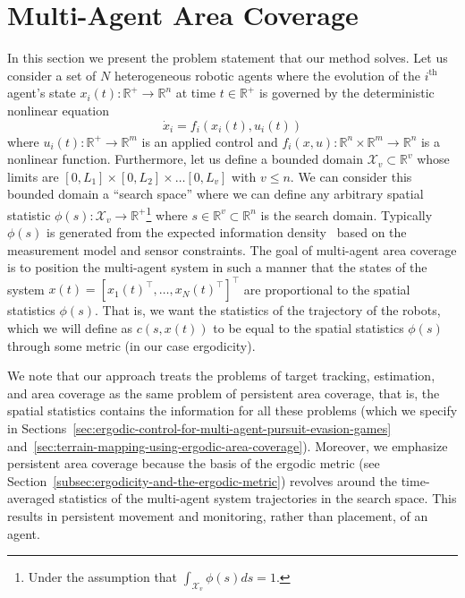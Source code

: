 \documentclass[letterpaper, 10 pt, conference]{ieeeconf}  %
\begin{document}
\section{Multi-Agent Area Coverage}
In this section we present the problem statement that our method solves.
Let us consider a set of $N$ heterogeneous robotic agents where the evolution of the $i^\text{th}$ agent's state $x_i(t) : \mathbb{R}^+ \to \mathbb{R}^n$  at time $t\in \mathbb{R}^+$ is governed by the deterministic nonlinear equation
\begin{equation}
\dot{x}_i = f_i(x_i(t), u_i(t))
\end{equation}
where $u_i(t) : \mathbb{R}^+ \to \mathbb{R}^m$ is an applied control and $f_i(x,u) : \mathbb{R}^n \times \mathbb{R}^m \to \mathbb{R}^n$ is a nonlinear function.
Furthermore, let us define a bounded domain $\mathcal{X}_v \subset \mathbb{R}^v$ whose limits are $\left[ 0, L_1\right]\times \left[ 0, L_2\right] \times \ldots \left[ 0, L_v\right]$ with $v \le n$.
We can consider this bounded domain a ``search space'' where we can define any arbitrary spatial statistic $\phi(s) : \mathcal{X}_v \to \mathbb{R}^+$\footnote{Under the assumption that $\int_{\mathcal{X}_v} \phi(s) ds = 1$.} where $s \in \mathbb{R}^v \subset \mathbb{R}^n$ is the search domain.
Typically $\phi(s)$ is generated from the expected information density~\cite{miller2016ergodic,mavrommatiTRO2017realTime} based on the measurement model and sensor constraints.
The goal of multi-agent area coverage is to position the multi-agent system in such a manner that the states of the system $x(t) = \left[x_1(t)^\top, \ldots, x_N(t)^\top \right]^\top$ are proportional to the spatial statistics $\phi(s)$.
That is, we want the statistics of the trajectory of the robots, which we will define as $c(s, x(t))$ to be equal to the spatial statistics $\phi(s)$ through some metric (in our case ergodicity).

We note that our approach treats the problems of target tracking, estimation, and area coverage as the same problem of persistent area coverage, that is, the spatial statistics contains the information for all these problems (which we specify in Sections~\ref{sec:ergodic-control-for-multi-agent-pursuit-evasion-games} and~\ref{sec:terrain-mapping-using-ergodic-area-coverage}).
Moreover, we emphasize persistent area coverage because the basis of the ergodic metric (see Section~\ref{subsec:ergodicity-and-the-ergodic-metric}) revolves around the time-averaged statistics of the multi-agent system trajectories in the search space.
This results in persistent movement and monitoring, rather than placement, of an agent.
\end{document}
